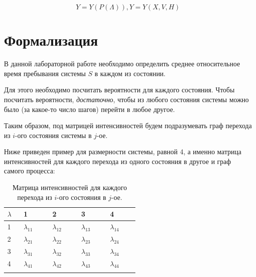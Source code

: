 \documentclass[a4paper,12pt]{article}
\begin{document}
	\begin{equation}
	Y = Y(P(\Lambda)), Y = Y(X, V, H)
	\end{equation}
	
	
	
	\section*{Формализация}
	
	
	В данной лабораторной работе необходимо определить среднее относительное время пребывания системы $S$ в каждом из состоянии.
	
	Для этого необходимо посчитать вероятности для каждого состояния. Чтобы посчитать вероятности, \textit{достаточно}, чтобы из любого со­стояния системы можно было (за какое-то число шагов) перейти в любое другое.
	
	Таким образом, под матрицей интенсивностей будем подразумевать граф перехода из $i$-ого состояния системы в $j$-ое.
	
	Ниже приведен пример для размерности системы, равной 4, а именно матрица интенсивностей для каждого перехода из одного состояния в другое и граф самого процесса:
	
	\begin{center}
		\begin{longtable}[h!]{|p{0.05\linewidth}|p{0.12\linewidth}|p{0.12\linewidth}|p{0.12\linewidth}|p{0.12\linewidth}|}
			\hline
			{$\lambda$} & {1} & {2} & {3} & {4}\\
			\hline
			{1} & {$\lambda_{11}$} & {$\lambda_{12}$} & {$\lambda_{13}$} & {$\lambda_{14}$}\\
			\hline
			{2} & {$\lambda_{21}$} & {$\lambda_{22}$} & {$\lambda_{23}$} & {$\lambda_{24}$}\\
			\hline
			{3} & {$\lambda_{31}$} & {$\lambda_{32}$} & {$\lambda_{33}$} & {$\lambda_{34}$}\\
			\hline
			{4} & {$\lambda_{41}$} & {$\lambda_{42}$} & {$\lambda_{43}$} & {$\lambda_{44}$}\\
			\hline
			\caption{Матрица интенсивностей для каждого перехода из $i$-ого состояния в $j$-ое.}
		\end{longtable}
	\end{center}
\end{document}
